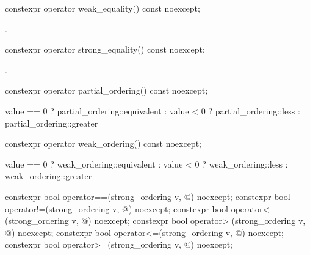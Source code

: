 %
\begin{itemdecl}
constexpr operator weak_equality() const noexcept;
\end{itemdecl}

\begin{itemdescr}
\pnum
\returns
{}.
\end{itemdescr}

%
\begin{itemdecl}
constexpr operator strong_equality() const noexcept;
\end{itemdecl}

\begin{itemdescr}
\pnum
\returns
{}.
\end{itemdescr}

%
\begin{itemdecl}
constexpr operator partial_ordering() const noexcept;
\end{itemdecl}

\begin{itemdescr}
\pnum
\returns
\begin{codeblock}
value == 0 ? partial_ordering::equivalent :
value < 0  ? partial_ordering::less :
             partial_ordering::greater
\end{codeblock}
\end{itemdescr}

%
\begin{itemdecl}
constexpr operator weak_ordering() const noexcept;
\end{itemdecl}

\begin{itemdescr}
\pnum
\returns
\begin{codeblock}
value == 0 ? weak_ordering::equivalent :
value < 0  ? weak_ordering::less :
             weak_ordering::greater
\end{codeblock}
\end{itemdescr}

%
%
%
%
%
%
\begin{itemdecl}
constexpr bool operator==(strong_ordering v, @\unspec@) noexcept;
constexpr bool operator!=(strong_ordering v, @\unspec@) noexcept;
constexpr bool operator< (strong_ordering v, @\unspec@) noexcept;
constexpr bool operator> (strong_ordering v, @\unspec@) noexcept;
constexpr bool operator<=(strong_ordering v, @\unspec@) noexcept;
constexpr bool operator>=(strong_ordering v, @\unspec@) noexcept;
\end{itemdecl}


